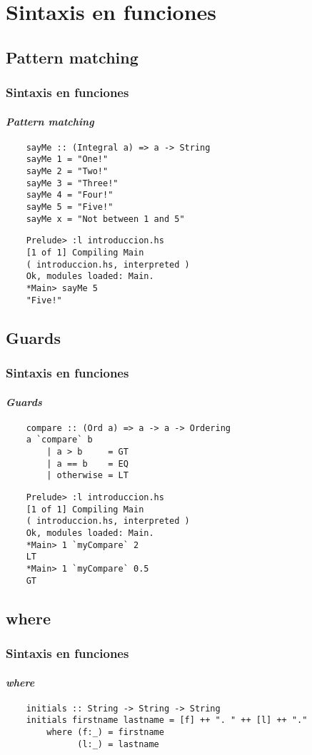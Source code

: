 \section{Sintaxis en funciones}
\subsection{Pattern matching}
\begin{frame}[fragile]
  \frametitle{Sintaxis en funciones}
  \framesubtitle{\emph{Pattern matching}}
  \begin{verbatim}
    sayMe :: (Integral a) => a -> String
    sayMe 1 = "One!"
    sayMe 2 = "Two!"
    sayMe 3 = "Three!"
    sayMe 4 = "Four!"
    sayMe 5 = "Five!"
    sayMe x = "Not between 1 and 5"
  \end{verbatim}

  \begin{verbatim}
    Prelude> :l introduccion.hs
    [1 of 1] Compiling Main
    ( introduccion.hs, interpreted )
    Ok, modules loaded: Main.
    *Main> sayMe 5
    "Five!"
  \end{verbatim}
\end{frame}

\subsection{Guards}
\begin{frame}[fragile]
  \frametitle{Sintaxis en funciones}
  \framesubtitle{\emph{Guards}}
  \begin{verbatim}
    compare :: (Ord a) => a -> a -> Ordering
    a `compare` b
        | a > b     = GT
        | a == b    = EQ
        | otherwise = LT
  \end{verbatim}
  \begin{verbatim}
    Prelude> :l introduccion.hs
    [1 of 1] Compiling Main
    ( introduccion.hs, interpreted )
    Ok, modules loaded: Main.
    *Main> 1 `myCompare` 2
    LT
    *Main> 1 `myCompare` 0.5
    GT
  \end{verbatim}
\end{frame}

\subsection{where}
\begin{frame}[fragile]
  \frametitle{Sintaxis en funciones}
  \framesubtitle{\emph{where}}
  \begin{verbatim}
    initials :: String -> String -> String
    initials firstname lastname = [f] ++ ". " ++ [l] ++ "."
        where (f:_) = firstname
              (l:_) = lastname
  \end{verbatim}
\end{frame}
